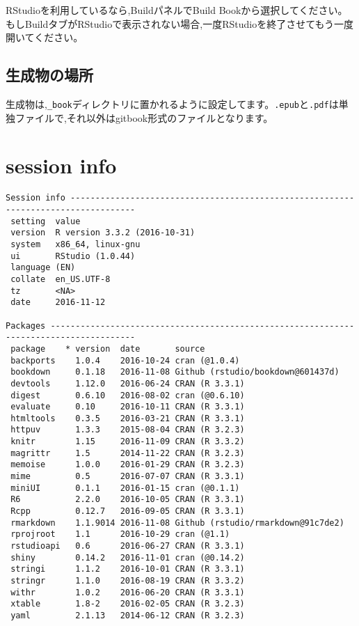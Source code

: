 \documentclass[
]{book}
\begin{document}
RStudioを利用しているなら,BuildパネルでBuild Bookから選択してください。もしBuildタブがRStudioで表示されない場合,一度RStudioを終了させてもう一度開いてください。

\subsection{生成物の場所}\label{ux751fux6210ux7269ux306eux5834ux6240}

生成物は,\texttt{\_book}ディレクトリに置かれるように設定してます。\texttt{.epub}と\texttt{.pdf}は単独ファイルで,それ以外はgitbook形式のファイルとなります。

\section{session info}\label{session-info}

\begin{verbatim}
Session info -----------------------------------------------------------------------------------
 setting  value                       
 version  R version 3.3.2 (2016-10-31)
 system   x86_64, linux-gnu           
 ui       RStudio (1.0.44)            
 language (EN)                        
 collate  en_US.UTF-8                 
 tz       <NA>                        
 date     2016-11-12                  

Packages ---------------------------------------------------------------------------------------
 package    * version  date       source                            
 backports    1.0.4    2016-10-24 cran (@1.0.4)                     
 bookdown     0.1.18   2016-11-08 Github (rstudio/bookdown@601437d) 
 devtools     1.12.0   2016-06-24 CRAN (R 3.3.1)                    
 digest       0.6.10   2016-08-02 cran (@0.6.10)                    
 evaluate     0.10     2016-10-11 CRAN (R 3.3.1)                    
 htmltools    0.3.5    2016-03-21 CRAN (R 3.3.1)                    
 httpuv       1.3.3    2015-08-04 CRAN (R 3.2.3)                    
 knitr        1.15     2016-11-09 CRAN (R 3.3.2)                    
 magrittr     1.5      2014-11-22 CRAN (R 3.2.3)                    
 memoise      1.0.0    2016-01-29 CRAN (R 3.2.3)                    
 mime         0.5      2016-07-07 CRAN (R 3.3.1)                    
 miniUI       0.1.1    2016-01-15 cran (@0.1.1)                     
 R6           2.2.0    2016-10-05 CRAN (R 3.3.1)                    
 Rcpp         0.12.7   2016-09-05 CRAN (R 3.3.1)                    
 rmarkdown    1.1.9014 2016-11-08 Github (rstudio/rmarkdown@91c7de2)
 rprojroot    1.1      2016-10-29 cran (@1.1)                       
 rstudioapi   0.6      2016-06-27 CRAN (R 3.3.1)                    
 shiny        0.14.2   2016-11-01 cran (@0.14.2)                    
 stringi      1.1.2    2016-10-01 CRAN (R 3.3.1)                    
 stringr      1.1.0    2016-08-19 CRAN (R 3.3.2)                    
 withr        1.0.2    2016-06-20 CRAN (R 3.3.1)                    
 xtable       1.8-2    2016-02-05 CRAN (R 3.2.3)                    
 yaml         2.1.13   2014-06-12 CRAN (R 3.2.3)     
\end{verbatim}
\end{document}
